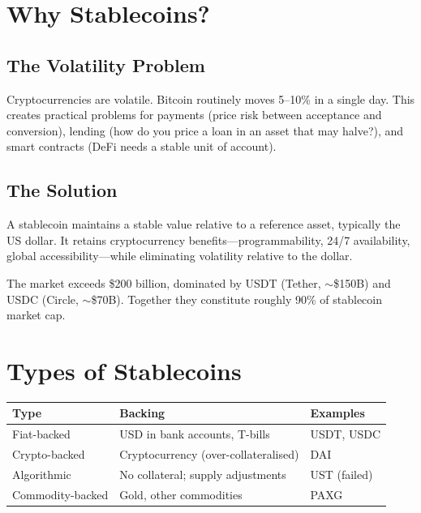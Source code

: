 \documentclass[11pt,a4paper]{article}
\begin{document}
\section{Why Stablecoins?}

\subsection{The Volatility Problem}

Cryptocurrencies are volatile. Bitcoin routinely moves 5--10\% in a single day. This creates practical problems for payments (price risk between acceptance and conversion), lending (how do you price a loan in an asset that may halve?), and smart contracts (DeFi needs a stable unit of account).

\subsection{The Solution}

A stablecoin maintains a stable value relative to a reference asset, typically the US dollar. It retains cryptocurrency benefits---programmability, 24/7 availability, global accessibility---while eliminating volatility relative to the dollar.

The market exceeds \$200 billion, dominated by USDT (Tether, $\sim$\$150B) and USDC (Circle, $\sim$\$70B). Together they constitute roughly 90\% of stablecoin market cap.

\section{Types of Stablecoins}

\begin{center}
\begin{tabular}{llp{4cm}}
\toprule
\textbf{Type} & \textbf{Backing} & \textbf{Examples} \\
\midrule
Fiat-backed & USD in bank accounts, T-bills & USDT, USDC \\
Crypto-backed & Cryptocurrency (over-collateralised) & DAI \\
Algorithmic & No collateral; supply adjustments & UST (failed) \\
Commodity-backed & Gold, other commodities & PAXG \\
\bottomrule
\end{tabular}
\end{center}
\end{document}
